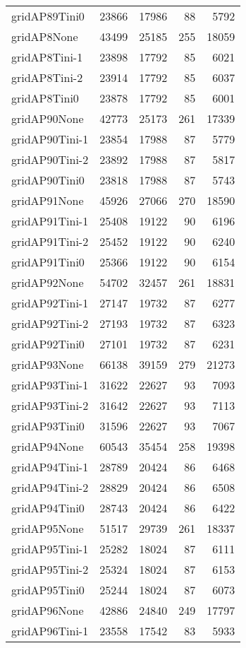 \begin{longtable}{lrrrr}
gridAP89Tini0 & 23866 & 17986 & 88 & 5792 \\
gridAP8None & 43499 & 25185 & 255 & 18059 \\
gridAP8Tini-1 & 23898 & 17792 & 85 & 6021 \\
gridAP8Tini-2 & 23914 & 17792 & 85 & 6037 \\
gridAP8Tini0 & 23878 & 17792 & 85 & 6001 \\
gridAP90None & 42773 & 25173 & 261 & 17339 \\
gridAP90Tini-1 & 23854 & 17988 & 87 & 5779 \\
gridAP90Tini-2 & 23892 & 17988 & 87 & 5817 \\
gridAP90Tini0 & 23818 & 17988 & 87 & 5743 \\
gridAP91None & 45926 & 27066 & 270 & 18590 \\
gridAP91Tini-1 & 25408 & 19122 & 90 & 6196 \\
gridAP91Tini-2 & 25452 & 19122 & 90 & 6240 \\
gridAP91Tini0 & 25366 & 19122 & 90 & 6154 \\
gridAP92None & 54702 & 32457 & 261 & 18831 \\
gridAP92Tini-1 & 27147 & 19732 & 87 & 6277 \\
gridAP92Tini-2 & 27193 & 19732 & 87 & 6323 \\
gridAP92Tini0 & 27101 & 19732 & 87 & 6231 \\
gridAP93None & 66138 & 39159 & 279 & 21273 \\
gridAP93Tini-1 & 31622 & 22627 & 93 & 7093 \\
gridAP93Tini-2 & 31642 & 22627 & 93 & 7113 \\
gridAP93Tini0 & 31596 & 22627 & 93 & 7067 \\
gridAP94None & 60543 & 35454 & 258 & 19398 \\
gridAP94Tini-1 & 28789 & 20424 & 86 & 6468 \\
gridAP94Tini-2 & 28829 & 20424 & 86 & 6508 \\
gridAP94Tini0 & 28743 & 20424 & 86 & 6422 \\
gridAP95None & 51517 & 29739 & 261 & 18337 \\
gridAP95Tini-1 & 25282 & 18024 & 87 & 6111 \\
gridAP95Tini-2 & 25324 & 18024 & 87 & 6153 \\
gridAP95Tini0 & 25244 & 18024 & 87 & 6073 \\
gridAP96None & 42886 & 24840 & 249 & 17797 \\
gridAP96Tini-1 & 23558 & 17542 & 83 & 5933 \\

\end{longtable}
